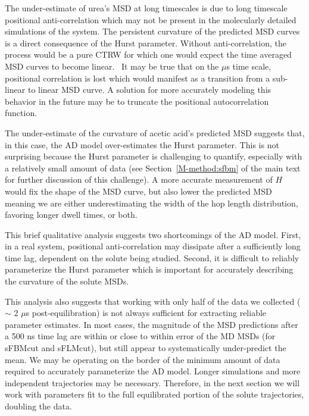 \documentclass{article}
\begin{document}
  The under-estimate of urea's MSD at long timescales is due to long timescale
  positional anti-correlation which may not be present in the molecularly 
  detailed simulations of the system. The 
  persistent curvature of the predicted MSD curves is a direct consequence of 
  the Hurst parameter. Without anti-correlation, the process would be 
  a pure CTRW for which one would expect the time averaged MSD curves to become 
  linear.~\cite{meroz_toolbox_2015} It may be true that on the $\mu$s time scale, 
  positional correlation is lost which would manifest as a transition from a sub-linear
  to linear MSD curve. A solution for more accurately modeling this behavior in  
  the future may be to truncate the positional autocorrelation function.~\cite{molina-garcia_crossover_2018}
  
  The under-estimate of the curvature of acetic acid's predicted MSD suggests that,
  in this case, the AD model over-estimates the Hurst parameter. This is not surprising
  because the Hurst parameter is challenging to quantify, especially with a relatively 
  small amount of data (see Section~\ref{M-method:sfbm} of the main text for further discussion of this 
  challenge). A more accurate measurement of $H$ would fix the shape of the MSD curve,
  but also lower the predicted MSD meaning we are either underestimating the width of
  the hop length distribution, favoring longer dwell times, or both.
  
  This brief qualitative analysis suggests two shortcomings of the AD model. First, in
  a real system, positional anti-correlation may dissipate after a sufficiently long 
  time lag, dependent on the solute being studied. Second, it is difficult to reliably
  parameterize the Hurst parameter which is important for accurately describing the 
  curvature of the solute MSDs.
  
  This analysis also suggests that working with only half of the data we collected
  ($\sim$ 2 $\mu$s post-equilibration) is not always sufficient for extracting reliable
  parameter estimates. In most cases, the magnitude of the MSD predictions after a 
  500 ns time lag are within or close to within error of the MD MSDs (for sFBMcut and
  sFLMcut), but still appear to systematically under-predict the mean. We may be
  operating on the border of the minimum amount of data required to accurately 
  parameterize the AD model. Longer simulations and more independent trajectories may
  be necessary. Therefore, in the next section we will work with parameters fit to the
  full equilibrated portion of the solute trajectories, doubling the data.
  
\end{document}
